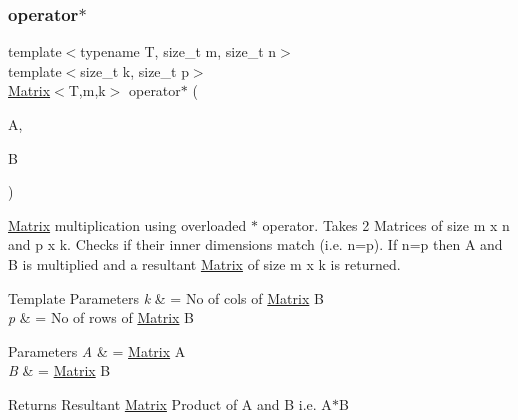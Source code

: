\subsubsection{\texorpdfstring{operator$\ast$}{operator*}}
{\footnotesize\ttfamily template$<$typename T, size\+\_\+t m, size\+\_\+t n$>$ \\
template$<$size\+\_\+t k, size\+\_\+t p$>$ \\
\hyperlink{classMATOPS_1_1Matrix}{Matrix}$<$T,m,k$>$ operator$\ast$ (\begin{DoxyParamCaption}\item[{const \hyperlink{classMATOPS_1_1Matrix}{Matrix}$<$ T, m, n $>$ \&}]{A,  }\item[{const \hyperlink{classMATOPS_1_1Matrix}{Matrix}$<$ T, p, k $>$ \&}]{B }\end{DoxyParamCaption})\hspace{0.3cm}{\ttfamily [friend]}}



\hyperlink{classMATOPS_1_1Matrix}{Matrix} multiplication using overloaded $\ast$ operator. Takes 2 Matrices of size m x n and p x k. Checks if their inner dimensions match (i.\+e. n=p). If n=p then A and B is multiplied and a resultant \hyperlink{classMATOPS_1_1Matrix}{Matrix} of size m x k is returned. 


\begin{DoxyTemplParams}{Template Parameters}
{\em k} & = No of cols of \hyperlink{classMATOPS_1_1Matrix}{Matrix} B \\
\hline
{\em p} & = No of rows of \hyperlink{classMATOPS_1_1Matrix}{Matrix} B \\
\hline
\end{DoxyTemplParams}

\begin{DoxyParams}{Parameters}
{\em A} & = \hyperlink{classMATOPS_1_1Matrix}{Matrix} A \\
\hline
{\em B} & = \hyperlink{classMATOPS_1_1Matrix}{Matrix} B \\
\hline
\end{DoxyParams}
\begin{DoxyReturn}{Returns}
Resultant \hyperlink{classMATOPS_1_1Matrix}{Matrix} Product of A and B i.\+e. A$\ast$B 
\end{DoxyReturn}

